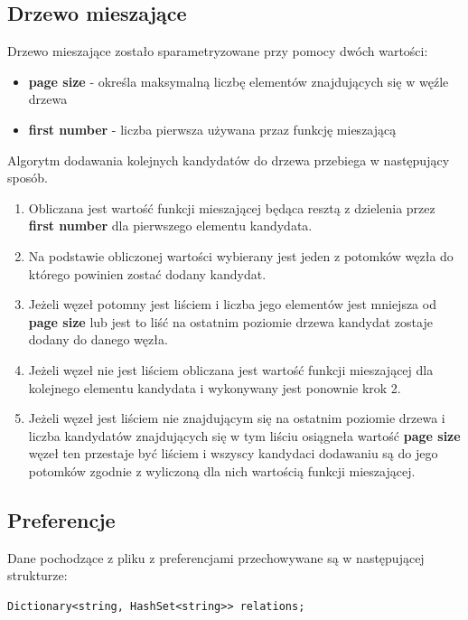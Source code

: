 \documentclass[a4paper,12pt]{article}
\begin{document}
\subsection{Drzewo mieszające}
Drzewo mieszające zostało sparametryzowane przy pomocy dwóch wartości:
\begin{itemize}
\item {\bf page size} - określa maksymalną liczbę elementów znajdujących się w węźle drzewa
\item {\bf first number} - liczba pierwsza używana przaz funkcję mieszającą
\end{itemize}

Algorytm dodawania kolejnych kandydatów do drzewa przebiega w następujący sposób.
\begin{enumerate}
\item Obliczana jest wartość funkcji mieszającej będąca resztą z dzielenia przez {\bf first number} dla pierwszego elementu kandydata.
\item Na podstawie obliczonej wartości wybierany jest jeden z potomków węzła do którego powinien zostać dodany kandydat.
\item Jeżeli węzeł potomny jest liściem i liczba jego elementów jest mniejsza od {\bf page size} lub jest to liść na ostatnim poziomie drzewa kandydat zostaje dodany do danego węzła.
\item Jeżeli węzeł nie jest liściem obliczana jest wartość funkcji mieszającej dla kolejnego elementu kandydata i wykonywany jest ponownie krok 2.
\item Jeżeli węzeł jest liściem nie znajdującym się na ostatnim poziomie drzewa i liczba kandydatów znajdujących się w tym liściu osiągneła wartość {\bf page size} węzeł ten przestaje być liściem i wszyscy kandydaci dodawaniu są do jego potomków zgodnie z wyliczoną dla nich wartością funkcji mieszającej.
\end{enumerate}

\subsection{Preferencje}

Dane pochodzące z pliku z preferencjami przechowywane są w następującej strukturze:
\begin{center}
\begin{lstlisting}
Dictionary<string, HashSet<string>> relations;
\end{lstlisting}
\end{center}
\end{document}
